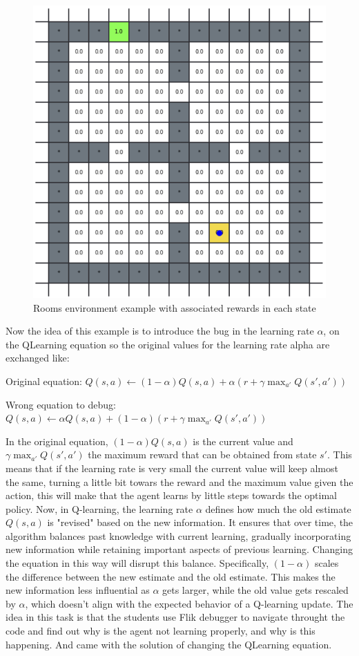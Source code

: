 \begin{figure}[h]
  \centering
  \includegraphics[width=0.5\columnwidth]{figures/rooms.png}
  \caption{Rooms environment example with associated rewards in each state}
  \label{fig:rooms}
\end{figure}

Now the idea of this example is to introduce the bug in the learning rate $\alpha$, on the QLearning equation 
so the original values for the learning rate alpha are exchanged like:

Original equation:
$
Q(s, a) \leftarrow (1-\alpha) Q(s, a) + \alpha \left( r + \gamma \max_{a'} Q(s', a') \right)
$

Wrong equation to debug:
$
Q(s, a) \leftarrow  \alpha Q(s, a) + (1-\alpha) \left( r + \gamma \max_{a'} Q(s', a') \right)
$

In the original equation,  $(1-\alpha) Q(s, a)$ is the current value and $\gamma \max_{a'} Q(s', a')$ the maximum 
reward that can be obtained from state $s'$. This means that if the learning rate is very small the current value 
will keep almost the same, turning a little bit towars the reward and the maximum value given the action, this will 
make that the agent learns by little steps towards the optimal policy. Now, in Q-learning, the learning rate $\alpha$
defines how much the old estimate $Q(s,a)$ is "revised" based on the new information. It ensures that over time, 
the algorithm balances past knowledge with current learning, gradually incorporating new information while 
retaining important aspects of previous learning. Changing the equation in this way will disrupt this balance. Specifically,
 $(1-\alpha)$ scales the difference between the new estimate and the old estimate. This makes the new information less influential as $\alpha$ gets larger, while the old value gets rescaled by $\alpha$, which doesn't align with the expected behavior of a Q-learning update. The idea in this task is that the students use Flik debugger to navigate throught 
the code and find out why is the agent not learning properly, and why is this happening. And came with the solution of changing the QLearning equation.


